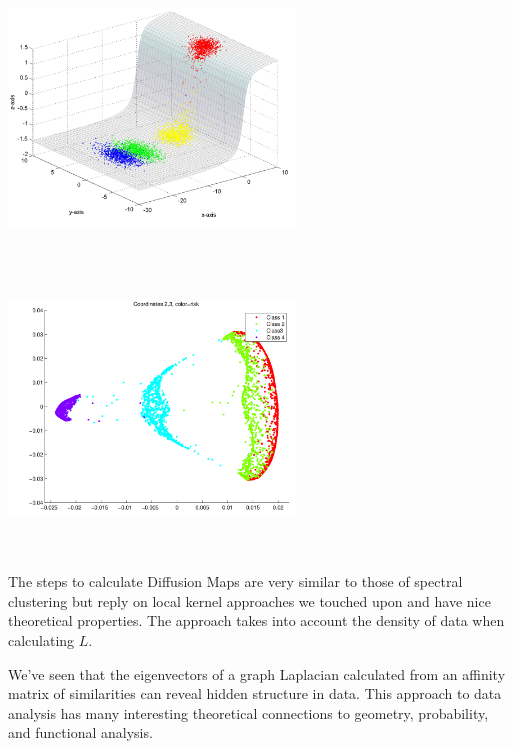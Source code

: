 \includegraphics[width=3in,height=3in]{images/3ddata.png}
\includegraphics[width=3in,height=3in]{images/diffusion_maps.png}

The steps to calculate Diffusion Maps are very similar to those of spectral clustering but reply on local kernel approaches we touched upon and have nice theoretical properties.  The approach takes into account the density of data when calculating $L$. 

We've seen that the eigenvectors of a graph Laplacian calculated from an affinity matrix of similarities can reveal hidden structure in data. This approach to data analysis has many interesting theoretical connections to geometry, probability, and functional analysis. 






















